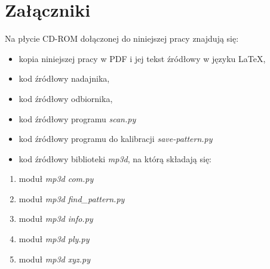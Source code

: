 \appendix
\chapter{Załączniki}

Na płycie CD-ROM dołączonej do niniejszej pracy znajdują się:
\begin{itemize}
 \item kopia niniejszej pracy w PDF i jej tekst źródłowy w języku \LaTeX,
 \item kod źródłowy nadajnika,
 \item kod źródłowy odbiornika,
 \item kod źródłowy programu \textit{scan.py} 
 \item kod źródłowy programu do kalibracji \textit{save-pattern.py}
 \item kod źródłowy biblioteki \textit{mp3d}, na którą składają się:
\end{itemize}

  \begin{enumerate}
    \item moduł \textit{mp3d com.py}
    \item moduł \textit{mp3d find_pattern.py}
    \item moduł \textit{mp3d info.py}
    \item moduł \textit{mp3d ply.py}
    \item moduł \textit{mp3d xyz.py}
  \end{enumerate} 
